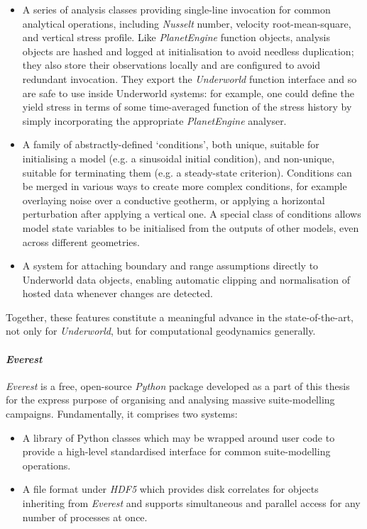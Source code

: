 \documentclass[a4paper,11pt,oneside]{book}
\begin{document}
\begin{itemize}
\item A series of analysis classes providing single-line invocation for common analytical operations, including \textit{Nusselt} number, velocity root-mean-square, and vertical stress profile. Like \textit{PlanetEngine} function objects, analysis objects are hashed and logged at initialisation to avoid needless duplication; they also store their observations locally and are configured to avoid redundant invocation. They export the \textit{Underworld} function interface and so are safe to use inside Underworld systems: for example, one could define the yield stress in terms of some time-averaged function of the stress history by simply incorporating the appropriate \textit{PlanetEngine} analyser.


\item A family of abstractly-defined `conditions', both unique, suitable for initialising a model (e.g. a sinusoidal initial condition), and non-unique, suitable for terminating them (e.g. a steady-state criterion). Conditions can be merged in various ways to create more complex conditions, for example overlaying noise over a conductive geotherm, or applying a horizontal perturbation after applying a vertical one. A special class of conditions allows model state variables to be initialised from the outputs of other models, even across different geometries.


\item A system for attaching boundary and range assumptions directly to Underworld data objects, enabling automatic clipping and normalisation of hosted data whenever changes are detected.
\end{itemize}

Together, these features constitute a meaningful advance in the state-of-the-art, not only for \textit{Underworld}, but for computational geodynamics generally.

\paragraph{\textit{Everest}}

\textit{Everest} is a free, open-source \textit{Python} package developed as a part of this thesis for the express purpose of organising and analysing massive suite-modelling campaigns. Fundamentally, it comprises two systems:

\begin{itemize}
\item A library of Python classes which may be wrapped around user code to provide a high-level standardised interface for common suite-modelling operations.


\item A file format under \textit{HDF5} which provides disk correlates for objects inheriting from \textit{Everest} and supports simultaneous and parallel access for any number of processes at once.
\end{itemize}
\end{document}
